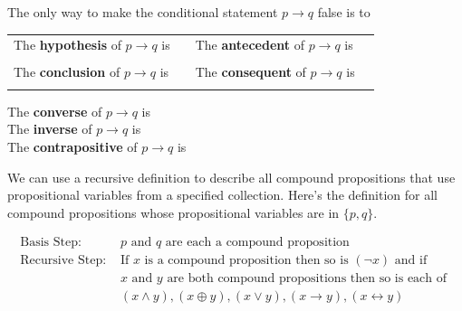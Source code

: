 \documentclass[12pt, oneside]{article}
\begin{document}
The only way to make  the conditional statement $p \to q$ false is to \underline{\phantom{\hspace{3in}}}\\

\begin{tabular}{llll}
The {\bf  hypothesis}  of $p \to q$ is  &\underline{\phantom{\hspace{1in}}} &
The {\bf  antecedent}  of $p \to q$ is  &\underline{\phantom{\hspace{1in}}} \\
&&&  \\
The {\bf  conclusion}  of $p \to q$ is & \underline{\phantom{\hspace{1in}}}&
The {\bf  consequent}  of $p \to q$ is & \underline{\phantom{\hspace{1in}}}\\
&&&  \\
\end{tabular}
 

The {\bf converse}  of $p \to q$ is \underline{}\\

The {\bf inverse}  of $p \to q$ is \underline{}\\

The {\bf contrapositive}  of $p \to q$ is \underline{} \\
 \vfill


We can use a recursive definition to describe all 
compound propositions that use propositional variables 
from a specified collection.  Here's the definition
for all compound propositions whose propositional variables 
are in $\{p, q\}$.

\[
\begin{array}{ll}
\textrm{Basis Step: } & p \textrm{ and } q \textrm{ are each a compound proposition} \\
\textrm{Recursive Step: } & \textrm{If } x \textrm{ is a compound proposition then so is } (\lnot x) 
\textrm{ and if } \\
& x \textrm{ and } y \textrm{ are both compound propositions then so is each of }\\
&(x \land y), (x \oplus y), (x \lor y), (x \to y), (x \leftrightarrow y)
\end{array}
\] 
\end{document}
